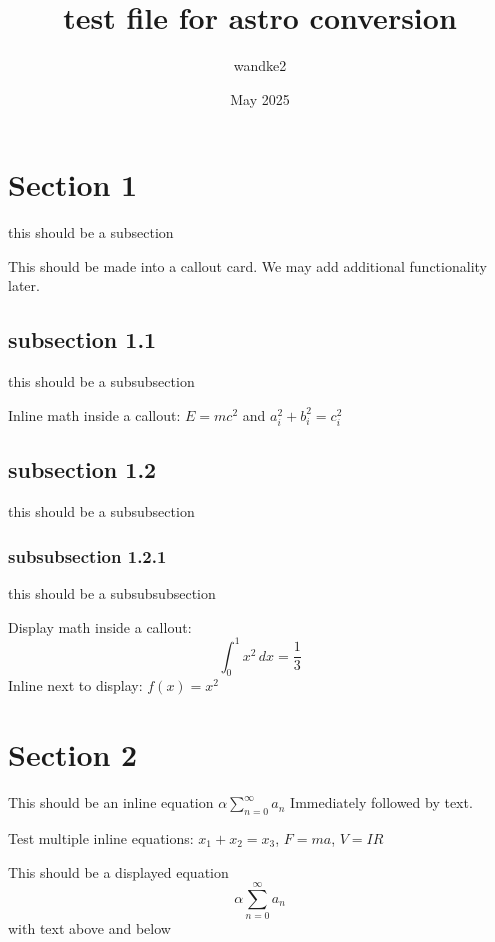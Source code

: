 \documentclass{article}
\title{test file for astro conversion}
\author{wandke2}
\date{May 2025}
\newenvironment{callout}
{
}
{ 
}
\begin{document}
\maketitle

\section{Section 1}
this should be a subsection

\begin{callout}
    This should be made into a callout card. We may add additional functionality later.
\end{callout}

\subsection{subsection 1.1}
this should be a subsubsection

\begin{callout}
    Inline math inside a callout: $E = mc^2$ and $a_i^2 + b_i^2 = c_i^2$
\end{callout}

\subsection{subsection 1.2}
this should be a subsubsection

\subsubsection{subsubsection 1.2.1}
this should be a subsubsubsection

\begin{callout}
    Display math inside a callout:
    \[
        \int_0^1 x^2 \, dx = \frac{1}{3}
    \]
    Inline next to display: $f(x) = x^2$
\end{callout}

\section{Section 2}

This should be an inline equation  $\alpha \sum_{n=0}^\infty a_n$  Immediately followed by text. 

\begin{callout}
    Test multiple inline equations: $x_1 + x_2 = x_3$, $F = ma$, $V = IR$
\end{callout}

This should be a displayed equation
\begin{equation}
    \alpha \sum_{n=0}^\infty a_n
\end{equation}
with text above and below
\end{document}
